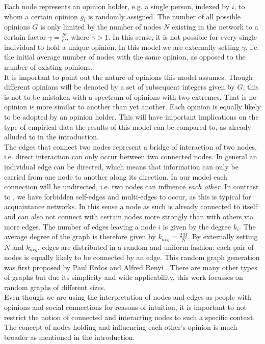 \documentclass[11pt]{article}
\begin{document}
Each node represents an opinion holder, e.g. a single person, indexed by $i$, to whom a certain opinion $g_i$ is randomly assigned. The number of all possible opinions $G$ is only limited by the number of nodes $N$ existing in the network to a certain factor $\gamma = \frac{N}{G}$, where $\gamma > 1$. In this sense, it is not possible for every single individual to hold a unique opinion. In this model we are externally setting $\gamma$, i.e. the initial average number of nodes with the same opinion, as opposed to the number of existing opinions.\\ 

										
It is important to point out the nature of opinions this model assumes. Though different opinions will be denoted by a set of subsequent integers given by $G$, this is not to be mistaken with a spectrum of opinions with two extremes. That is no opinion is more similar to another than yet another. Each opinion is equally likely to be adopted by an opinion holder. This will have important implications on the type of empirical data the results of this model can be compared to, as already alluded to in the introduction.\\


The edges that connect two nodes represent a bridge of interaction of two nodes, i.e. direct interaction can only occur between two connected nodes. In general an individual edge can be directed, which means that information can only be carried from one node to another along its direction. In our model each connection will be undirected, i.e. two nodes can influence \textit{each other}. In contrast to \cite{main paper}, we have forbidden self-edges and multi-edges to occur, as this is typical for acquaintance networks. In this sense a node as such is already connected to itself and can also not connect with certain nodes more strongly than with others via more edges. The number of edges leaving a node $i$ is given by the degree $k_i$. The average degree of the graph is therefore given by $k_{avg}=\frac{2M}{N}$. By externally setting $N$ and $k_{avg}$, edges are distributed in a random and uniform fashion: each pair of nodes is equally likely to be connected by an edge. This random graph generation was first proposed by Paul Erdos and Alfred Renyi \cite{erdos renyi}. There are many other types of graphs but due its simplicity and wide applicability, this work focusses on random graphs of different sizes.\\


Even though we are using the interpretation of nodes and edges as people with opinions and social connections for reasons of intuition, it is important to not restrict the notion of connected and interacting nodes to such a specific context. The concept of nodes holding and influencing each other's opinion is much broader as mentioned in the introduction.\\
\end{document}
